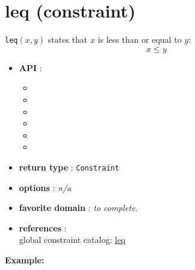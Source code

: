\label{leq}
\hypertarget{leq}{}

\section{leq (constraint)}\label{leq:leqconstraint}\hypertarget{leq:leqconstraint}{}
\begin{notedef}
  \texttt{leq}$(x,y)$ states that $x$ is less than or equal to $y$:
$$x \le y$$
\end{notedef}

\begin{itemize}
	\item \textbf{API} :
	\begin{itemize}
		\item {}
		\item {}
		\item {}
		\item {}
		\item {}
		\item {}
	\end{itemize}
	\item \textbf{return type} : \texttt{Constraint}
	\item \textbf{options} : \emph{n/a}
	\item \textbf{favorite domain} : \emph{to complete}.
	\item \textbf{references} :\\
      global constraint catalog: \href{http://www.emn.fr/x-info/sdemasse/gccat/Cleq.html}{leq}
\end{itemize}

\textbf{Example:}

